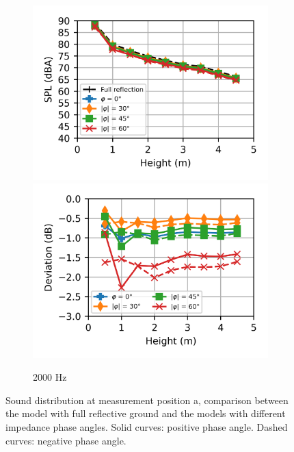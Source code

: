 \begin{figure}[H]\ContinuedFloat
	\begin{subfigure}[b]{\textwidth}
		\centering
		\includegraphics{fig/chap5/impedance/third_octave/SPL_2000_Hz.png}
		\hfill
		\includegraphics{fig/chap5/impedance/third_octave/deviation_2000_Hz.png}
		\caption{2000 Hz}
	\end{subfigure}

	\caption{Sound distribution at measurement position a, comparison between the model with full reflective ground and the models with different impedance phase angles. Solid curves: positive phase angle. Dashed curves: negative phase angle.}
	\label{fig:third_octave_over_height_impedance}
\end{figure}


